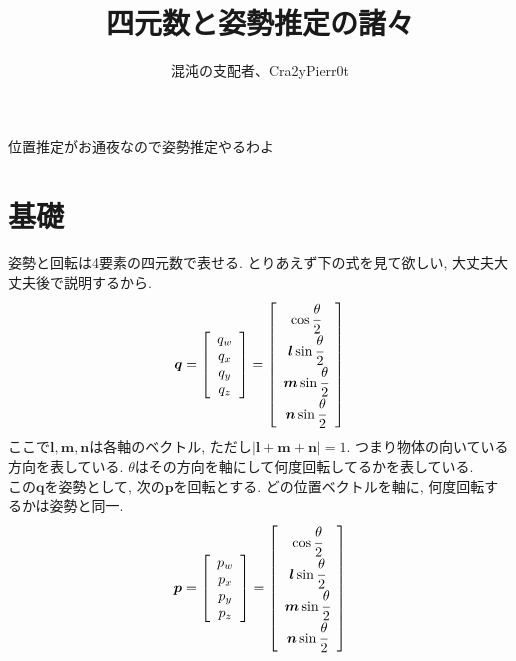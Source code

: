 \documentclass[a4j]{jsarticle}
\begin{document}
\title{四元数と姿勢推定の諸々}
\author{混沌の支配者、Cra2yPierr0t}
\maketitle
位置推定がお通夜なので姿勢推定やるわよ
\section{基礎}
姿勢と回転は4要素の四元数で表せる. とりあえず下の式を見て欲しい, 大丈夫大丈夫後で説明するから.
\begin{align}
    \bm{q} = \left[
        \begin{array}{c}
            q_w \\
            q_x \\
            q_y \\
            q_z 
        \end{array}
    \right] = \left[
        \begin{array}{c}
            \cos\cfrac{\theta}{2}  \\
            \bm{l}\sin\cfrac{\theta}{2} \\
            \bm{m}\sin\cfrac{\theta}{2} \\
            \bm{n}\sin\cfrac{\theta}{2} 
        \end{array} 
    \right] \nonumber 
\end{align}
ここで$\bm{l}, \bm{m}, \bm{n}$は各軸のベクトル, ただし$|\bm{l}+\bm{m}+\bm{n}|=1$. つまり物体の向いている方向を表している. $\theta$はその方向を軸にして何度回転してるかを表している. \\
この$\bm{q}$を姿勢として, 次の$\bm{p}$を回転とする. どの位置ベクトルを軸に, 何度回転するかは姿勢と同一.
\begin{align}
    \bm{p} = \left[
        \begin{array}{c}
            p_w \\
            p_x \\
            p_y \\
            p_z 
        \end{array}
    \right] = \left[
        \begin{array}{c}
            \cos\cfrac{\theta}{2}  \\
            \bm{l}\sin\cfrac{\theta}{2} \\
            \bm{m}\sin\cfrac{\theta}{2} \\
            \bm{n}\sin\cfrac{\theta}{2} 
        \end{array} 
    \right] \nonumber 
\end{align}
\end{document}
